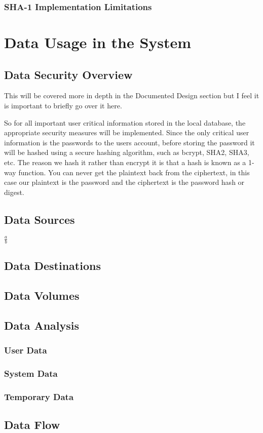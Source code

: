 \subsubsection{SHA-1 Implementation Limitations}

\section{Data Usage in the System}

\subsection{Data Security Overview}
This will be covered more in depth in the Documented Design section but I feel it is important to briefly go over it here.

So for all important user critical information stored in the local database, the appropriate security measures will be implemented. Since the only critical user information is the passwords to the users account, before storing the password it will be hashed using a secure hashing algorithm, such as bcrypt, SHA2, SHA3, etc. The reason we hash it rather than encrypt it is that a hash is known as a 1-way function. You can never get the plaintext back from the ciphertext, in this case our plaintext is the password and the ciphertext is the password hash or digest. 

\subsection{Data Sources}

$ \frac{a}{b} $

\subsection{Data Destinations}
\subsection{Data Volumes}

\subsection{Data Analysis}
\subsubsection{User Data}
\subsubsection{System Data}
\subsubsection{Temporary Data}

\subsection{Data Flow}



